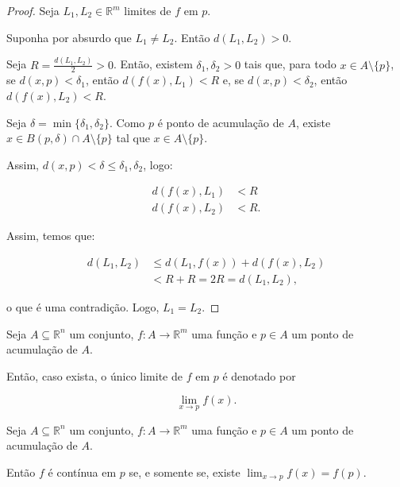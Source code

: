 \begin{proof}
    Seja $L_1, L_2 \in \mathbb R^m$ limites de $f$ em $p$.

    Suponha por absurdo que $L_1\neq L_2$. Então $d(L_1, L_2) > 0$.

    Seja $R=\frac{d(L_1, L_2)}{2} > 0$. Então, existem $\delta_1, \delta_2 > 0$ tais que, para todo $x \in A\setminus\{p\}$, se $d(x, p) < \delta_1$, então $d(f(x), L_1) < R$ e, se $d(x, p) < \delta_2$, então $d(f(x), L_2) < R$.

    Seja $\delta = \min\{\delta_1, \delta_2\}$.
    Como $p$ é ponto de acumulação de $A$, existe $x \in B(p, \delta)\cap A\setminus \{p\}$ tal que $x \in A\setminus\{p\}$.
    
    Assim, $d(x, p)<\delta\leq \delta_1, \delta_2$, logo:

    \begin{align*}
        d(f(x), L_1) &< R \\
        d(f(x), L_2) &< R.
    \end{align*}

    Assim, temos que:

    \begin{align*}
        d(L_1, L_2) &\leq d(L_1, f(x)) + d(f(x), L_2) \\
        &< R + R = 2R = d(L_1, L_2),
    \end{align*}

    o que é uma contradição. Logo, $L_1 = L_2$.
\end{proof}
\begin{definition}
    Seja $A\subseteq \mathbb R^n$ um conjunto, $f: A \to \mathbb R^m$ uma função e $p \in A$ um ponto de acumulação de $A$.

    Então, caso exista, o único limite de $f$ em $p$ é denotado por
    
    \begin{equation*}
    \lim_{x\to p} f(x).
    \end{equation*}
\end{definition}

\begin{proposition}
    Seja $A\subseteq \mathbb R^n$ um conjunto, $f: A \to \mathbb R^m$ uma função e $p \in A$ um ponto de acumulação de $A$.

    Então $f$ é contínua em $p$ se, e somente se, existe $\lim_{x\to p} f(x) = f(p)$.
\end{proposition}

